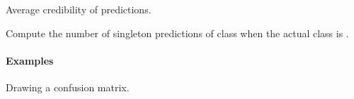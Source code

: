 \documentclass[letterpaper,10pt,english]{sphinxmanual}
\begin{document}
\begin{fulllineitems}

\begin{fulllineitems}
\label{cp.evaluation:cp.evaluation.ResultsClass.credibility}
Average credibility of predictions.

\end{fulllineitems}


\begin{fulllineitems}
\label{cp.evaluation:cp.evaluation.ResultsClass.confusion}
Compute the number of singleton predictions of class  when the actual class is .
\paragraph{Examples}

Drawing a confusion matrix.


\end{fulllineitems}
\end{fulllineitems}
\end{document}
